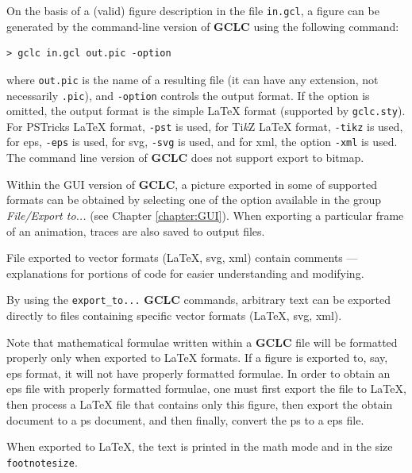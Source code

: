 \documentclass[a4paper]{book}
\newcommand{\gclc}{{\bfseries GCLC}\xspace}
\begin{document}
On the basis of a (valid) figure description in the file \verb|in.gcl|,
a figure can be generated by the command-line version of \gclc using
the following command:

\begin{verbatim}
> gclc in.gcl out.pic -option
\end{verbatim}

\noindent
where \verb|out.pic| is the name of a resulting file (it can have any
extension, not necessarily \verb|.pic|), and \verb|-option| controls
the output format. If the option is omitted, the output format is
the simple \LaTeX{} format (supported by \verb|gclc.sty|).
For PSTricks \LaTeX{} format, \verb|-pst| is used,
for Ti{\em k}Z \LaTeX{} format, \verb|-tikz| is used,
for {\sc eps}, \verb|-eps| is used, for {\sc svg}, \verb|-svg| is
used, and for {\sc xml}, the option \verb|-xml| is used.
The command line version of \gclc does not support export to bitmap.

Within the GUI version of \gclc, a picture exported in some of 
supported formats can be obtained by selecting one of the option 
available in the group {\it File/Export to...} (see Chapter 
\ref{chapter:GUI}). When exporting a particular frame of an
animation, traces are also saved to output files.

File exported to vector formats (\LaTeX, {\sc svg}, {\sc xml})
contain comments --- explanations for portions of code for
easier understanding and modifying.

By using the \verb|export_to...| \gclc commands, arbitrary text can
be exported directly to files containing specific vector formats
(\LaTeX, {\sc svg}, {\sc xml}).

Note that mathematical formulae written within a \gclc file
will be formatted properly only when exported to \LaTeX{} formats.
If a figure is exported to, say, {\sc eps} format, it will
not have properly formatted formulae. In order to obtain an {\sc eps}
file with properly formatted formulae, one must first export the
file to \LaTeX{}, then process a \LaTeX{} file that contains
only this figure, then export the obtain document to a {\sc ps}
document, and then finally, convert the {\sc ps} to a {\sc eps} file.

When exported to \LaTeX{}, the text is printed in the math mode and
in the size \verb|footnotesize|.
\end{document}
